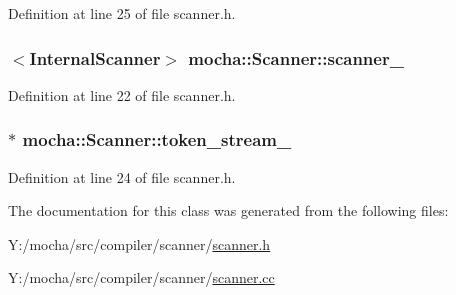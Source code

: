 Definition at line 25 of file scanner.h.

\hypertarget{classmocha_1_1_scanner_a2ce71c6e214bb37d67b3c8c46288b798}{
\subsubsection[{scanner\_\-}]{$<${\bf InternalScanner}$>$ {\bf mocha::Scanner::scanner\_\-}}}
\label{classmocha_1_1_scanner_a2ce71c6e214bb37d67b3c8c46288b798}


Definition at line 22 of file scanner.h.

\hypertarget{classmocha_1_1_scanner_ac9dd3a3420dcc112d63220f8392a34a5}{
\subsubsection[{token\_\-stream\_\-}]{$\ast$ {\bf mocha::Scanner::token\_\-stream\_\-}}}
\label{classmocha_1_1_scanner_ac9dd3a3420dcc112d63220f8392a34a5}


Definition at line 24 of file scanner.h.



The documentation for this class was generated from the following files:\begin{DoxyCompactItemize}
\item 
Y:/mocha/src/compiler/scanner/\hyperlink{scanner_8h}{scanner.h}\item 
Y:/mocha/src/compiler/scanner/\hyperlink{scanner_8cc}{scanner.cc}\end{DoxyCompactItemize}
